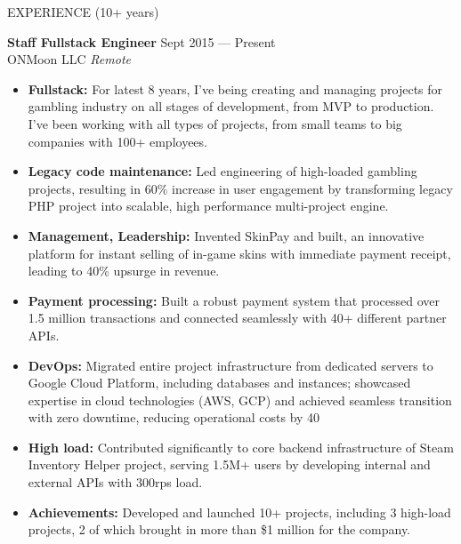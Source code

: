 \documentclass{template} %
\begin{document}
\begin{rSection}{EXPERIENCE (10+ years)}

\textbf{Staff Fullstack Engineer} \hfill Sept 2015 --- Present\\
ONMoon LLC \hfill \textit{Remote}

\begin{minipage}{0.95\textwidth}
 \begin{itemize}
    \vspace{0.1cm}
    \itemsep 1pt {} 
    \item \textbf{Fullstack:} For latest 8 years, I've being creating and managing projects for gambling industry on all stages of development, from MVP to production. I've been working with all types of projects, from small teams to big companies with 100+ employees.
    \item \textbf{Legacy code maintenance:} Led engineering of high-loaded gambling projects, resulting in 60\% increase in user
    engagement by transforming legacy PHP project into scalable, high performance multi-project engine.
    \item \textbf{Management, Leadership:} Invented SkinPay and built, an innovative platform for instant selling of in-game skins with immediate payment receipt, leading to 40\% upsurge in revenue.
    \item \textbf{Payment processing:} Built a robust payment system that processed over 1.5 million transactions and connected seamlessly with 40+ different partner APIs.
    \item \textbf{DevOps:} Migrated entire project infrastructure from dedicated servers to Google Cloud Platform, including databases and instances; showcased expertise in cloud technologies (AWS, GCP) and achieved seamless transition with zero downtime, reducing operational costs by 40%
    \item \textbf{High load:} Contributed significantly to core backend infrastructure of Steam Inventory Helper project, serving 1.5M+ users by developing internal and external APIs with 300rps load.
    \item \textbf{Achievements:} Developed and launched 10+ projects, including 3 high-load projects, 2 of which brought in more than \$1 million for the company.
 \end{itemize}
\end{minipage}

\vspace{0.5cm}


\end{rSection}
\end{document}
